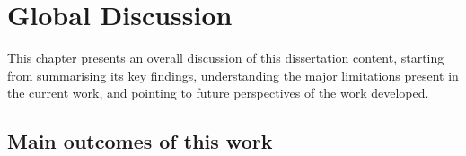 
%


\newpage
\chapter{Global Discussion}
This chapter presents an overall discussion of this dissertation content, starting from summarising its key findings, understanding the major limitations present in the current work, and pointing to future perspectives of the work developed.



\newpage
\section{Main outcomes of this work}

